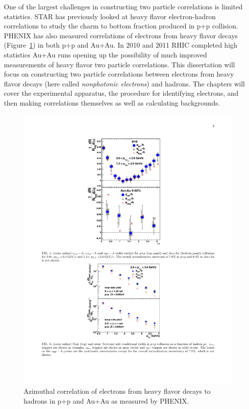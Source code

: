 One of the largest challenges in constructing two particle correlations is limited statistics. STAR has previously looked at heavy flavor electron-hadron correlations to study the charm to bottom fraction produced in p+p collision. PHENIX has also measured correlations of electrons from heavy flavor decays (Figure~\ref{fig:phenix_eh}) in both p+p and Au+Au. In 2010 and 2011 RHIC completed high statistics Au+Au runs opening up the possibility of much improved measurements of heavy flavor two particle correlations. This dissertation will focus on constructing two particle correlations between electrons from heavy flavor decays (here called \textit{nonphotonic electrons}) and hadrons. The chapters will cover the experimental apparatus, the procedure for identifying electrons, and then making correlations themselves as well as calculating backgrounds. 

\begin{figure}[htbp]
\begin{center}
\includegraphics[scale=1.3]{Plots/Intro/phenix_eh.pdf}
\end{center}
\caption[PHENIX e-h correlation]{Azimuthal correlation of electrons from heavy flavor decays to hadrons in p+p and Au+Au as measured by PHENIX.}
\label{fig:phenix_eh}
\end{figure}
